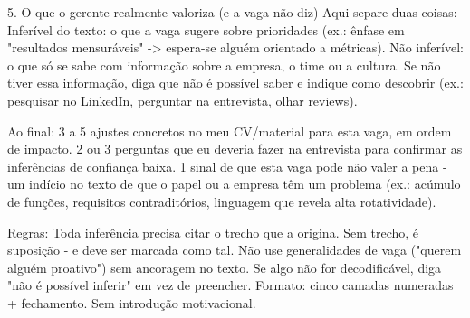 \documentclass[11pt, a4paper]{article}
\begin{document}
\begin{promptbox}
5. O que o gerente realmente valoriza (e a vaga não diz)
 Aqui separe duas coisas:
  Inferível do texto: o que a vaga sugere sobre prioridades (ex.: ênfase em "resultados mensuráveis" -> espera-se alguém orientado a métricas).
  Não inferível: o que só se sabe com informação sobre a empresa, o time ou a cultura. Se não tiver essa informação, diga que não é possível saber e indique como descobrir (ex.: pesquisar no LinkedIn, perguntar na entrevista, olhar reviews).
	
Ao final:
 3 a 5 ajustes concretos no meu CV/material para esta vaga, em ordem de impacto.
 2 ou 3 perguntas que eu deveria fazer na entrevista para confirmar as inferências de confiança baixa.
 1 sinal de que esta vaga pode não valer a pena - um indício no texto de que o papel ou a empresa têm um problema (ex.: acúmulo de funções, requisitos contraditórios, linguagem que revela alta rotatividade).
	
Regras:
 Toda inferência precisa citar o trecho que a origina. Sem trecho, é suposição - e deve ser marcada como tal.
 Não use generalidades de vaga ("querem alguém proativo") sem ancoragem no texto.
 Se algo não for decodificável, diga "não é possível inferir" em vez de preencher.
 Formato: cinco camadas numeradas + fechamento. Sem introdução motivacional.
\end{promptbox}
\end{document}
